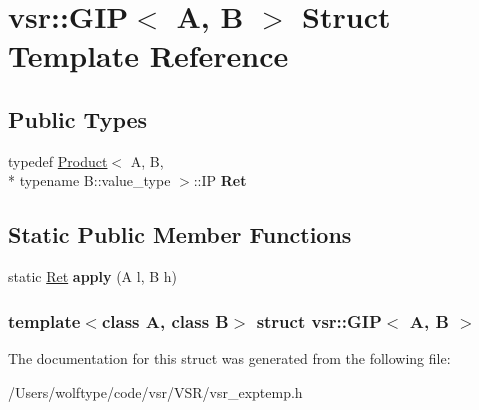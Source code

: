 \hypertarget{structvsr_1_1_g_i_p}{\section{vsr\-:\-:G\-I\-P$<$ A, B $>$ Struct Template Reference}
\label{structvsr_1_1_g_i_p}
}
\subsection*{Public Types}
\begin{DoxyCompactItemize}
\item 
\hypertarget{structvsr_1_1_g_i_p_a5784920b22d7c5f9db896d573d80312e}{typedef \hyperlink{structvsr_1_1_product}{Product}$<$ A, B, \\*
typename B\-::value\-\_\-type $>$\-::I\-P {\bfseries Ret}}\label{structvsr_1_1_g_i_p_a5784920b22d7c5f9db896d573d80312e}

\end{DoxyCompactItemize}
\subsection*{Static Public Member Functions}
\begin{DoxyCompactItemize}
\item 
\hypertarget{structvsr_1_1_g_i_p_a2aceb023139ea3596feca3f670476bbb}{static \hyperlink{classvsr_1_1_m_v}{Ret} {\bfseries apply} (A l, B h)}\label{structvsr_1_1_g_i_p_a2aceb023139ea3596feca3f670476bbb}

\end{DoxyCompactItemize}
\subsubsection*{template$<$class A, class B$>$ struct vsr\-::\-G\-I\-P$<$ A, B $>$}



The documentation for this struct was generated from the following file\-:\begin{DoxyCompactItemize}
\item 
/\-Users/wolftype/code/vsr/\-V\-S\-R/vsr\-\_\-exptemp.\-h\end{DoxyCompactItemize}
